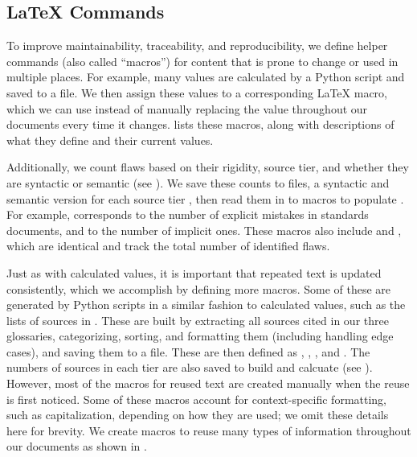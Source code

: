 \subsection[LaTeX Commands]{\LaTeX{} Commands}\label{macros}
To improve maintainability, traceability, and reproducibility, we define
helper commands (also called ``macros'') for content that is prone to change
or used in multiple places. For example, many values are calculated by a Python
script and saved to a file. We then assign these values to a corresponding
\LaTeX{} macro, which we can use instead of manually replacing the value
throughout our documents every time it changes.  lists
these macros, along with descriptions of what they define and their current
values.



\label{flawCounts}
Additionally, we count flaws based on their rigidity, source tier,
and whether they are syntactic or semantic (see
).
We save these counts to files, a syntactic and semantic version for each
source tier%
, then read them in to macros
to populate . For example,
 corresponds to the number of explicit mistakes in
standards documents, and  to the number of implicit
ones. These macros also include  and \newline
{}, which are identical and
track the total number of identified flaws.

\label{text-macros}
Just as with calculated values, it is important that repeated text is updated
consistently, which we accomplish by defining more macros. Some of these are
generated by Python scripts in a similar fashion to calculated values, such as
the lists of sources in . These are built by extracting all
sources cited in our three glossaries, categorizing, sorting, and formatting
them (including handling edge cases), and saving them to a file. These are then
defined as , , , and
.
The numbers of sources in each tier are also saved to build 
and calcuate  (see ). However, most of the
macros for reused text are created manually when the reuse is first noticed.
Some of these macros account for context-specific formatting, such as
capitalization, depending on how they are used; we omit these details here for
brevity. We create macros to reuse many types of information throughout our
documents as shown in .


